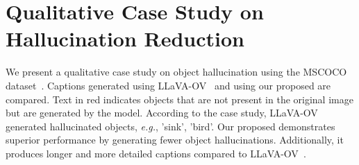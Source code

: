 \section{Qualitative Case Study on Hallucination Reduction}\label{app:case_study}
We present a qualitative case study on object hallucination using the MSCOCO dataset~\citep{Chen2015MicrosoftCC}. Captions generated using LLaVA-OV~\citep{li2024llava} and using our proposed \algname are compared. Text in red indicates objects that are not present in the original image but are generated by the model. According to the case study, LLaVA-OV~\citep{li2024llava} generated hallucinated objects, \textit{e.g.}, 'sink', 'bird'. Our proposed \algname demonstrates superior performance by generating fewer object hallucinations. Additionally, it produces longer and more detailed captions compared to LLaVA-OV~\citep{li2024llava}.

